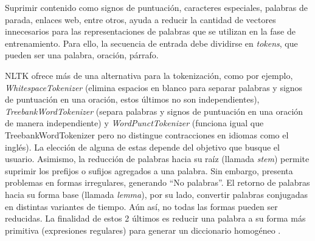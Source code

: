 Suprimir contenido como signos de puntuación, caracteres especiales, palabras de parada, enlaces web, entre otros, ayuda a reducir la cantidad de vectores innecesarios para las representaciones de palabras que se utilizan en la fase de entrenamiento. Para ello, la secuencia de entrada debe dividirse en \textit{tokens}, que pueden ser una palabra, oración, párrafo.

NLTK ofrece más de una alternativa para la tokenización, como por ejemplo, \textit{WhitespaceTokenizer} (elimina espacios en blanco para separar palabras y signos de puntuación en una oración, estos últimos no son independientes), \textit{TreebankWordTokenizer} (separa palabras y signos de puntuación en una oración de manera independiente) y \textit{WordPunctTokenizer} (funciona igual que TreebankWordTokenizer pero no distingue contracciones en idiomas como el inglés). La elección de alguna de estas depende del objetivo que busque el usuario. Asimismo, la reducción de palabras hacia su raíz (llamada \textit{stem}) permite suprimir los prefijos o sufijos agregados a una palabra. Sin embargo, presenta problemas en formas irregulares, generando “No palabras”. El retorno de palabras hacia su forma base (llamada \textit{lemma}), por su lado, convertir palabras conjugadas en distintas variantes de tiempo. Aún así, no todas las formas pueden ser reducidas. La finalidad de estos 2 últimos es reducir una palabra a su forma más primitiva (expresiones regulares) para generar un diccionario homogéneo \parencite{tec_zimovnov2018text_preprocessing}.

